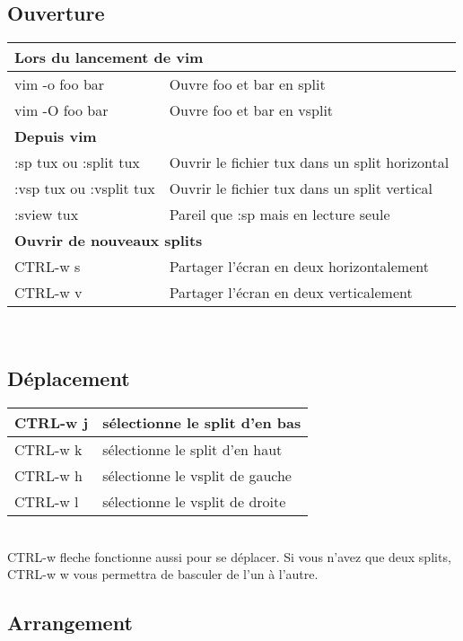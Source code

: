 \documentclass{article}
\begin{document}
\subsection{Ouverture}
\begin{tabular}{|p{3cm}| l|  }\hline
\multicolumn{2}{|l|}{\textbf{Lors du lancement de vim }} \\ \hline
    vim -o foo bar & Ouvre foo et bar en split\\ \hline
    vim -O foo bar & Ouvre foo et bar en vsplit\\ \hline
\multicolumn{2}{|l|}{\textbf{Depuis vim}}\\ \hline
	:sp tux ou :split tux & Ouvrir le fichier tux dans un split horizontal	\\ \hline
    :vsp tux ou :vsplit tux & Ouvrir le fichier tux dans un split vertical	\\ \hline
    :sview tux & Pareil que :sp mais en lecture seule \\ \hline
\multicolumn{2}{|l|}{\textbf{Ouvrir de nouveaux splits }} \\ \hline
	CTRL-w s & Partager l'écran en deux horizontalement	\\ \hline
    CTRL-w v & Partager l'écran en deux verticalement	\\ \hline
\end{tabular}\\

\subsection{Déplacement}

\begin{tabular}{|p{3cm}| l|  }\hline
CTRL-w j & sélectionne le split d'en bas\\ \hline
CTRL-w k & sélectionne le split d'en haut\\ \hline
CTRL-w h & sélectionne le vsplit de gauche\\ \hline
CTRL-w l & sélectionne le vsplit de droite\\ \hline
\end{tabular}\\

\noindent
 CTRL-w fleche fonctionne aussi pour se déplacer. Si vous n'avez que deux splits, CTRL-w w vous permettra de basculer de l'un à l'autre.
\subsection{Arrangement}
\end{document}
